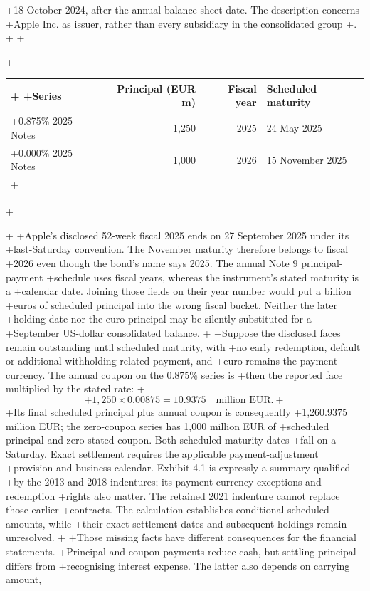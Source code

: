 +18 October 2024, after the annual balance-sheet date. The description concerns
+Apple Inc. as issuer, rather than every subsidiary in the consolidated group
+\citep[Exhibit 4.1, pp.~3--4]{apple2024}.
+
+\begin{center}
+\begin{tabular}{lrrl}
+\toprule
+Series & Principal (EUR m) & Fiscal year & Scheduled maturity\\\midrule
+0.875\% 2025 Notes &1,250&2025&24 May 2025\\
+0.000\% 2025 Notes &1,000&2026&15 November 2025\\\bottomrule
+\end{tabular}
+\end{center}
+
+Apple's disclosed 52-week fiscal 2025 ends on 27 September 2025 under its
+last-Saturday convention. The November maturity therefore belongs to fiscal
+2026 even though the bond's name says 2025. The annual Note 9 principal-payment
+schedule uses fiscal years, whereas the instrument's stated maturity is a
+calendar date. Joining those fields on their year number would put a billion
+euros of scheduled principal into the wrong fiscal bucket. Neither the later
+holding date nor the euro principal may be silently substituted for a
+September US-dollar consolidated balance.
+
+Suppose the disclosed faces remain outstanding until scheduled maturity, with
+no early redemption, default or additional withholding-related payment, and
+euro remains the payment currency. The annual coupon on the 0.875\% series is
+then the reported face multiplied by the stated rate:
+\[
+       1{,}250\times0.00875=10.9375\quad\text{million EUR}.
+\]
+Its final scheduled principal plus annual coupon is consequently
+1,260.9375 million EUR; the zero-coupon series has 1,000 million EUR of
+scheduled principal and zero stated coupon. Both scheduled maturity dates
+fall on a Saturday. Exact settlement requires the applicable payment-adjustment
+provision and business calendar. Exhibit 4.1 is expressly a summary qualified
+by the 2013 and 2018 indentures; its payment-currency exceptions and redemption
+rights also matter. The retained 2021 indenture cannot replace those earlier
+contracts. The calculation establishes conditional scheduled amounts, while
+their exact settlement dates and subsequent holdings remain unresolved.
+
+Those missing facts have different consequences for the financial statements.
+Principal and coupon payments reduce cash, but settling principal differs from
+recognising interest expense. The latter also depends on carrying amount,
